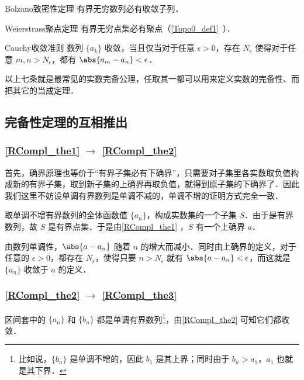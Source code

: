 \begin{theorem}{Bolzano致密性定理}\label{RCompl_the5}
有界无穷数列必有收敛子列．
\end{theorem}

\begin{theorem}{Weierstrass聚点定理}\label{RCompl_the6}
有界无穷点集必有聚点（\autoref{Topo0_def1}~）．
\end{theorem}

\begin{theorem}{Cauchy收敛准则}\label{RCompl_the7}
数列 $\{a_k\}$ 收敛，当且仅当对于任意 $\epsilon>0$，存在 $N_\epsilon$ 使得对于任意 $m, n>N_\epsilon$，都有 $\abs{a_m-a_n}<\epsilon$．
\end{theorem}

以上七条就是最常见的实数完备公理，任取其一都可以用来定义实数的完备性、而把其它的当成定理．

\subsection{完备性定理的互相推出}

\subsubsection{\autoref{RCompl_the1} $\to$ \autoref{RCompl_the2} }

首先，确界原理也等价于“有界子集必有下确界”，只需要对子集里各实数取负值构成新的有界子集，取到新子集的上确界再取负值，就得到原子集的下确界了．因此我们这里不妨设单调有界数列是单调不减的，单调不增的证明方式完全一致．

取单调不增有界数列的全体函数值 $\{a_n\}$，构成实数集的一个子集 $S$．由于是有界数列，故 $S$ 是有界点集．于是由\autoref{RCompl_the1} ，$S$ 有一个上确界 $a$．

由数列单调性，$\abs{a-a_n}$ 随着 $n$ 的增大而减小．同时由上确界的定义，对于任意的 $\epsilon>0$，都存在 $N_\epsilon$，使得只要 $n>N_\epsilon$ 就有 $\abs{a-a_n}<\epsilon$，而这就是 $\{a_n\}$ 收敛于 $a$ 的定义．

\subsubsection{\autoref{RCompl_the2} $\to$ \autoref{RCompl_the3} }

区间套中的 $\{a_n\}$ 和 $\{b_n\}$ 都是单调有界数列\footnote{比如说，$\{b_n\}$ 是单调不增的，因此 $b_1$ 是其上界；同时由于 $b_n>a_1$，$a_1$ 也就是其下界．}，由\autoref{RCompl_the2} 可知它们都收敛．

